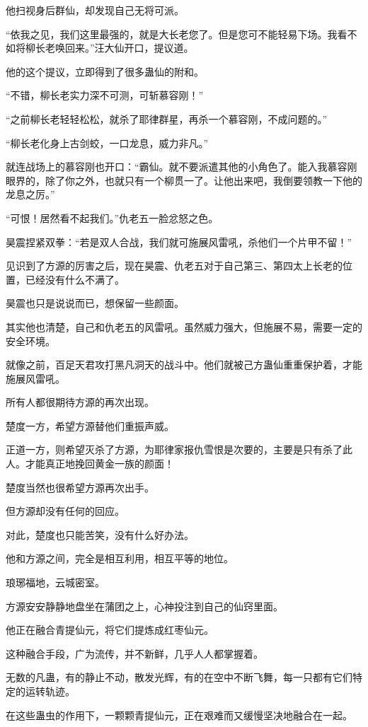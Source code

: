 \begin{this_body}
他扫视身后群仙，却发现自己无将可派。

“依我之见，我们这里最强的，就是大长老您了。但是您可不能轻易下场。我看不如将柳长老唤回来。”汪大仙开口，提议道。

他的这个提议，立即得到了很多蛊仙的附和。

“不错，柳长老实力深不可测，可斩慕容刚！”

“之前柳长老轻轻松松，就杀了耶律群星，再杀一个慕容刚，不成问题的。”

“柳长老化身上古剑蛟，一口龙息，威力非凡。”

就连战场上的慕容刚也开口：“霸仙。就不要派遣其他的小角色了。能入我慕容刚眼界的，除了你之外，也就只有一个柳贯一了。让他出来吧，我倒要领教一下他的龙息之厉。”

“可恨！居然看不起我们。”仇老五一脸忿怒之色。

昊震捏紧双拳：“若是双人合战，我们就可施展风雷吼，杀他们一个片甲不留！”

见识到了方源的厉害之后，现在昊震、仇老五对于自己第三、第四太上长老的位置，已经没有什么不满了。

昊震也只是说说而已，想保留一些颜面。

其实他也清楚，自己和仇老五的风雷吼。虽然威力强大，但施展不易，需要一定的安全环境。

就像之前，百足天君攻打黑凡洞天的战斗中。他们就被己方蛊仙重重保护着，才能施展风雷吼。

所有人都很期待方源的再次出现。

楚度一方，希望方源替他们重振声威。

正道一方，则希望灭杀了方源，为耶律家报仇雪恨是次要的，主要是只有杀了此人。才能真正地挽回黄金一族的颜面！

楚度当然也很希望方源再次出手。

但方源却没有任何的回应。

对此，楚度也只能苦笑，没有什么好办法。

他和方源之间，完全是相互利用，相互平等的地位。

琅琊福地，云城密室。

方源安安静静地盘坐在蒲团之上，心神投注到自己的仙窍里面。

他正在融合青提仙元，将它们提炼成红枣仙元。

这种融合手段，广为流传，并不新鲜，几乎人人都掌握着。

无数的凡蛊，有的静止不动，散发光辉，有的在空中不断飞舞，每一只都有它们特定的运转轨迹。

在这些蛊虫的作用下，一颗颗青提仙元，正在艰难而又缓慢坚决地融合在一起。


\end{this_body}
